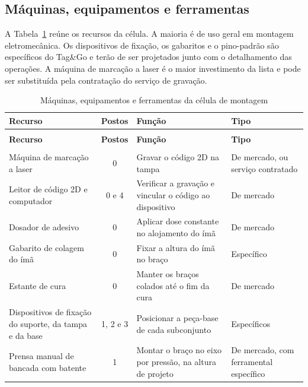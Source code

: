 \subsection{Máquinas, equipamentos e ferramentas}
\label{subsec:plano_recursos}

A Tabela~\ref{tab:plano_recursos} reúne os recursos da célula. A maioria é de uso geral em montagem eletromecânica. Os dispositivos de fixação, os gabaritos e o pino-padrão são específicos do Tag\&Go e terão de ser projetados junto com o detalhamento das operações. A máquina de marcação a laser é o maior investimento da lista e pode ser substituída pela contratação do serviço de gravação.

{\footnotesize
\setlength{\tabcolsep}{4pt}
\renewcommand{\arraystretch}{1.2}
\begin{longtable}{@{}>{\raggedright\arraybackslash}p{4.2cm} c >{\raggedright\arraybackslash}p{4.4cm} >{\raggedright\arraybackslash}p{2.9cm}@{}}
\caption{Máquinas, equipamentos e ferramentas da célula de montagem}
\label{tab:plano_recursos} \\
\hline
\textbf{Recurso} & \textbf{Postos} & \textbf{Função} & \textbf{Tipo} \\
\hline
\endfirsthead
\multicolumn{4}{l}{\textit{Tabela~\thetable\ (continuação)}} \\
\hline
\textbf{Recurso} & \textbf{Postos} & \textbf{Função} & \textbf{Tipo} \\
\hline
\endhead
\hline
\multicolumn{4}{r}{\textit{continua na próxima página}} \\
\endfoot
\hline
\endlastfoot
Máquina de marcação a laser & 0 & Gravar o código 2D na tampa & De mercado, ou serviço contratado \\
Leitor de código 2D e computador & 0 e 4 & Verificar a gravação e vincular o código ao dispositivo & De mercado \\
Dosador de adesivo & 0 & Aplicar dose constante no alojamento do ímã & De mercado \\
Gabarito de colagem do ímã & 0 & Fixar a altura do ímã no braço & Específico \\
Estante de cura & 0 & Manter os braços colados até o fim da cura & De mercado \\
Dispositivos de fixação do suporte, da tampa e da base & 1, 2 e 3 & Posicionar a peça-base de cada subconjunto & Específicos \\
Prensa manual de bancada com batente & 1 & Montar o braço no eixo por pressão, na altura de projeto & De mercado, com ferramental específico \\

\end{longtable}}
